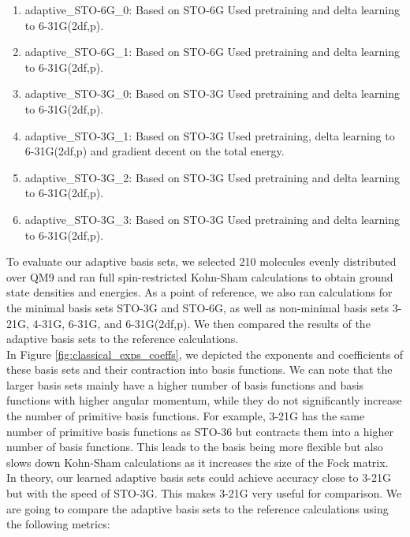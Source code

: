 \begin{enumerate}
    \item adaptive\_STO-6G\_0: Based on STO-6G Used pretraining and delta learning to 6-31G(2df,p).
    \item adaptive\_STO-6G\_1: Based on STO-6G Used pretraining and delta learning to 6-31G(2df,p).
    \item adaptive\_STO-3G\_0: Based on STO-3G Used pretraining and delta learning to 6-31G(2df,p).
    \item adaptive\_STO-3G\_1: Based on STO-3G Used pretraining, delta learning to 6-31G(2df,p) and gradient decent on the total energy.
    \item adaptive\_STO-3G\_2: Based on STO-3G Used pretraining and delta learning to 6-31G(2df,p).
    \item adaptive\_STO-3G\_3: Based on STO-3G Used pretraining and delta learning to 6-31G(2df,p).
\end{enumerate}
To evaluate our adaptive basis sets, we selected 210 molecules evenly distributed over QM9 and ran full spin-restricted Kohn-Sham calculations to obtain ground state densities and energies.
As a point of reference, we also ran calculations for the minimal basis sets STO-3G and STO-6G, as well as non-minimal basis sets 3-21G, 4-31G, 6-31G, and 6-31G(2df,p).
We then compared the results of the adaptive basis sets to the reference calculations.\\


In Figure \ref{fig:classical_exps_coeffs}, we depicted the exponents and coefficients of these basis sets and their contraction into basis functions.
We can note that the larger basis sets mainly have a higher number of basis functions and basis functions with higher angular momentum, while they do not significantly increase the number of primitive basis functions. For example, 3-21G has the same number of primitive basis functions as STO-36 but contracts them into a higher number of basis functions.
This leads to the basis being more flexible but also slows down Kohn-Sham calculations as it increases the size of the Fock matrix.\\


In theory, our learned adaptive basis sets could achieve accuracy close to 3-21G but with the speed of STO-3G. This makes 3-21G very useful for comparison.
We are going to compare the adaptive basis sets to the reference calculations using the following metrics:\\

